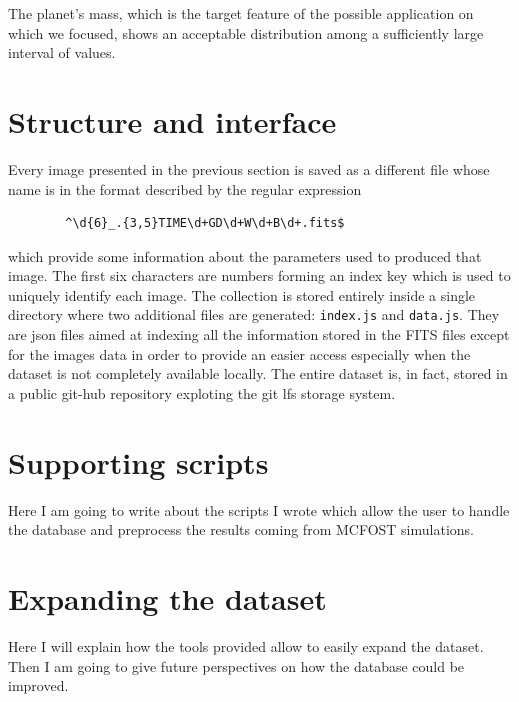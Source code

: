 \documentclass[a4paper,10pt]{report}
\begin{document}
The planet's mass, which is the target feature of the possible application on which we focused, shows an acceptable distribution among 
a sufficiently large interval of values.

\section{Structure and interface}

Every image presented in the previous section is saved as a different file whose name is in the format 
described by the regular expression 
\begin{center}
    \begin{lstlisting}
        ^\d{6}_.{3,5}TIME\d+GD\d+W\d+B\d+.fits$
    \end{lstlisting}
\end{center}
which provide some information about the parameters used to produced that image. The first six 
characters are numbers forming an index key which is used to uniquely identify each image.
The collection is stored entirely inside a single directory where two additional files are generated: 
\lstinline{index.js} and \lstinline{data.js}. They are json files aimed at indexing all the information stored in the FITS 
files except for the images data in order to provide an easier access especially when the dataset is not completely
available locally.
The entire dataset is, in fact, stored in a public git-hub repository exploting the git lfs storage system.

\section{Supporting scripts}
Here I am going to write about the scripts I wrote which allow the user to handle the database
and preprocess the results coming from MCFOST simulations.

\section{Expanding the dataset}

Here I will explain how the tools provided allow to easily expand the dataset. 
Then I am going to give future perspectives on how the database could be improved.
\end{document}
